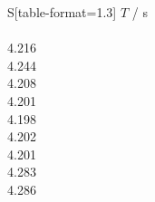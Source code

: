 \begin{subtable}{0.18\textwidth}
\centering
{}
\label{tab:magnet5-0}
\begin{tabular}{S[table-format=1.3]}
\toprule
{$T$ / s} \\
 \\
4.216 \\
4.244 \\
4.208 \\
4.201 \\
4.198 \\
4.202 \\
4.201 \\
4.283 \\
4.286 \\
\bottomrule
\end{tabular}
\end{subtable}